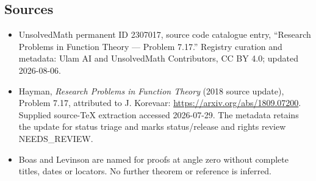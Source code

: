 \documentclass[11pt]{article}
\begin{document}
\subsection{Sources}
\begin{itemize}
\item UnsolvedMath permanent ID 2307017, source code catalogue entry, ``Research Problems in Function Theory --- Problem 7.17.'' Registry curation and metadata: Ulam AI and UnsolvedMath Contributors, CC BY 4.0; updated 2026-08-06.
\item Hayman, \emph{Research Problems in Function Theory} (2018 source update), Problem 7.17, attributed to J. Korevaar: \url{https://arxiv.org/abs/1809.07200}. Supplied source-TeX extraction accessed 2026-07-29. The metadata retains the update for status triage and marks status/release and rights review NEEDS\_REVIEW.
\item Boas and Levinson are named for proofs at angle zero without complete titles, dates or locators. No further theorem or reference is inferred.
\end{itemize}
\end{document}
